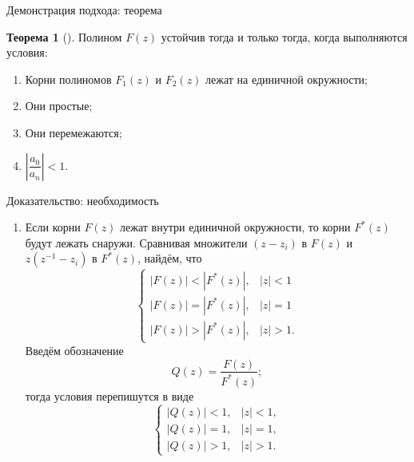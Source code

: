 \documentclass[notheorems,aspectratio=169]{beamer}
\theoremstyle{definition}
\newtheorem{theorem}{Теорема}
\newtheorem{remark}{Замечание}
\newcommand{\abs}[1]{\left| #1 \right|}
\begin{document}
\begin{frame}{Демонстрация подхода: теорема}
  \begin{theorem}[{\cite{Gnanasekaran1981,Schussler1976}}]
    Полином $F(z)$ устойчив тогда и только тогда, когда выполняются условия:
    \begin{enumerate}
    \item Корни полиномов $F_1(z)$ и $F_2(z)$ лежат на единичной окружности;
    \item Они простые;
    \item Они перемежаются;
    \item $\abs{\dfrac{a_0}{a_n}} < 1$.
    \end{enumerate}
  \end{theorem}

\end{frame}

\begin{frame}{Доказательство: необходимость}
  \begin{enumerate}
  \item Если корни $F(z)$ лежат внутри единичной окружности, то корни $F^*(z)$ будут лежать снаружи. Сравнивая множители
    $(z - z_i)$ в $F(z)$ и $z(z^{-1} - z_i)$ в $F^*(z)$, найдём, что
    \begin{equation}\label{eq:relations_1}
      \begin{cases}
        \abs{F(z)} < \abs{F^*(z)}, & \abs{z} < 1 \\
        \abs{F(z)} = \abs{F^*(z)}, & \abs{z} = 1 \\
        \abs{F(z)} > \abs{F^*(z)}, & \abs{z} > 1.
      \end{cases}
    \end{equation}
    Введём обозначение
    \begin{equation*}
      Q(z) = \frac{F(z)}{F^*(z)};
    \end{equation*}
    тогда условия перепишутся в виде
    \begin{equation}\label{eq:relations_2}
      \begin{cases}
        \abs{Q(z)} < 1, & \abs{z} < 1, \\
        \abs{Q(z)} = 1, & \abs{z} = 1, \\
        \abs{Q(z)} > 1, & \abs{z} > 1.
      \end{cases}
    \end{equation}
  \end{enumerate}
\end{frame}
\end{document}

